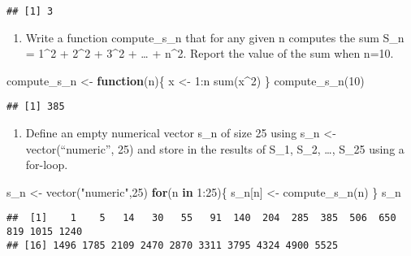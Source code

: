 \documentclass[
]{article}
\newenvironment{Shaded}{\begin{snugshade}}{\end{snugshade}}
\newcommand{\ControlFlowTok}[1]{\textcolor[rgb]{0.13,0.29,0.53}{\textbf{#1}}}
\newcommand{\DecValTok}[1]{\textcolor[rgb]{0.00,0.00,0.81}{#1}}
\newcommand{\FunctionTok}[1]{\textcolor[rgb]{0.00,0.00,0.00}{#1}}
\newcommand{\NormalTok}[1]{#1}
\newcommand{\OtherTok}[1]{\textcolor[rgb]{0.56,0.35,0.01}{#1}}
\newcommand{\SpecialCharTok}[1]{\textcolor[rgb]{0.00,0.00,0.00}{#1}}
\newcommand{\StringTok}[1]{\textcolor[rgb]{0.31,0.60,0.02}{#1}}
\providecommand{\tightlist}{%
  \setlength{\itemsep}{0pt}\setlength{\parskip}{0pt}}
\begin{document}
\begin{verbatim}
## [1] 3
\end{verbatim}

\begin{enumerate}
\def\labelenumi{\arabic{enumi}.}
\setcounter{enumi}{6}
\tightlist
\item
  Write a function compute\_s\_n that for any given n computes the sum
  S\_n = 1\^{}2 + 2\^{}2 + 3\^{}2 + \ldots{} + n\^{}2. Report the value
  of the sum when n=10.
\end{enumerate}

\begin{Shaded}
\begin{Highlighting}[]
\NormalTok{compute\_s\_n }\OtherTok{\textless{}{-}} \ControlFlowTok{function}\NormalTok{(n)\{}
\NormalTok{  x }\OtherTok{\textless{}{-}} \DecValTok{1}\SpecialCharTok{:}\NormalTok{n}
  \FunctionTok{sum}\NormalTok{(x}\SpecialCharTok{\^{}}\DecValTok{2}\NormalTok{)}
\NormalTok{\}}
\FunctionTok{compute\_s\_n}\NormalTok{(}\DecValTok{10}\NormalTok{)}
\end{Highlighting}
\end{Shaded}

\begin{verbatim}
## [1] 385
\end{verbatim}

\begin{enumerate}
\def\labelenumi{\arabic{enumi}.}
\setcounter{enumi}{7}
\tightlist
\item
  Define an empty numerical vector s\_n of size 25 using s\_n \textless-
  vector(``numeric'', 25) and store in the results of S\_1, S\_2,
  \ldots, S\_25 using a for-loop.
\end{enumerate}

\begin{Shaded}
\begin{Highlighting}[]
\NormalTok{s\_n }\OtherTok{\textless{}{-}} \FunctionTok{vector}\NormalTok{(}\StringTok{"numeric"}\NormalTok{,}\DecValTok{25}\NormalTok{)}
\ControlFlowTok{for}\NormalTok{(n }\ControlFlowTok{in} \DecValTok{1}\SpecialCharTok{:}\DecValTok{25}\NormalTok{)\{}
\NormalTok{  s\_n[n] }\OtherTok{\textless{}{-}} \FunctionTok{compute\_s\_n}\NormalTok{(n)}
\NormalTok{\}}
\NormalTok{s\_n}
\end{Highlighting}
\end{Shaded}

\begin{verbatim}
##  [1]    1    5   14   30   55   91  140  204  285  385  506  650  819 1015 1240
## [16] 1496 1785 2109 2470 2870 3311 3795 4324 4900 5525
\end{verbatim}
\end{document}
